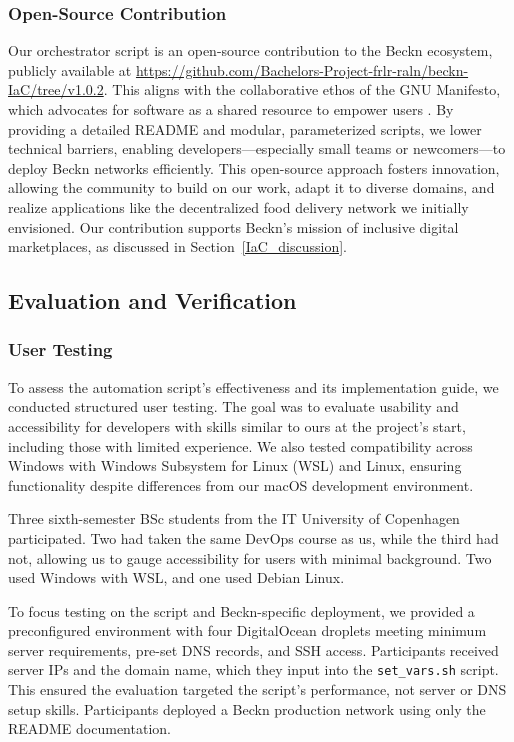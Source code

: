\subsubsection{Open-Source Contribution}
\label{open_source_contribution}
Our orchestrator script is an open-source contribution to the Beckn ecosystem, publicly available at \url{https://github.com/Bachelors-Project-frlr-raln/beckn-IaC/tree/v1.0.2}. This aligns with the collaborative ethos of the GNU Manifesto, which advocates for software as a shared resource to empower users \citep{stallman1985gnu}. By providing a detailed README and modular, parameterized scripts, we lower technical barriers, enabling developers—especially small teams or newcomers—to deploy Beckn networks efficiently. This open-source approach fosters innovation, allowing the community to build on our work, adapt it to diverse domains, and realize applications like the decentralized food delivery network we initially envisioned. Our contribution supports Beckn’s mission of inclusive digital marketplaces, as discussed in Section~\ref{IaC_discussion}.

\subsection{Evaluation and Verification}
\subsubsection{User Testing}
To assess the automation script’s effectiveness and its implementation guide, we conducted structured user testing. The goal was to evaluate usability and accessibility for developers with skills similar to ours at the project’s start, including those with limited experience. We also tested compatibility across Windows with Windows Subsystem for Linux (WSL) and Linux, ensuring functionality despite differences from our macOS development environment.

Three sixth-semester BSc students from the IT University of Copenhagen participated. Two had taken the same DevOps course as us, while the third had not, allowing us to gauge accessibility for users with minimal background. Two used Windows with WSL, and one used Debian Linux.

To focus testing on the script and Beckn-specific deployment, we provided a preconfigured environment with four DigitalOcean droplets meeting minimum server requirements, pre-set DNS records, and SSH access. Participants received server IPs and the domain name, which they input into the \texttt{set\_vars.sh} script. This ensured the evaluation targeted the script’s performance, not server or DNS setup skills. Participants deployed a Beckn production network using only the README documentation.

